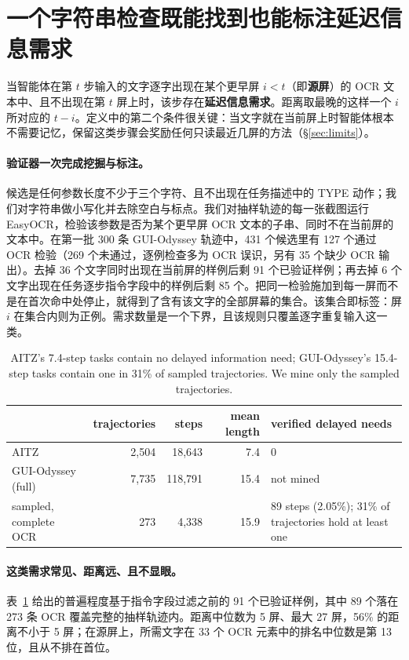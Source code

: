 \section{一个字符串检查既能找到也能标注延迟信息需求}
\label{sec:needs}
当智能体在第 $t$ 步输入的文字逐字出现在某个更早屏 $i<t$（即\textbf{源屏}）的 OCR 文本中、且不出现在第 $t$ 屏上时，该步存在\textbf{延迟信息需求}。距离取最晚的这样一个 $i$ 所对应的 $t-i$。定义中的第二个条件很关键：当文字就在当前屏上时智能体根本不需要记忆，保留这类步骤会奖励任何只读最近几屏的方法（\S\ref{sec:limits}）。

\paragraph{验证器一次完成挖掘与标注。} 候选是任何参数长度不少于三个字符、且不出现在任务描述中的 TYPE 动作；我们对字符串做小写化并去除空白与标点。我们对抽样轨迹的每一张截图运行 EasyOCR，检验该参数是否为某个更早屏 OCR 文本的子串、同时不在当前屏的文本中。在第一批 300 条 GUI-Odyssey 轨迹中，431 个候选里有 127 个通过 OCR 检验（269 个未通过，逐例检查多为 OCR 误识，另有 35 个缺少 OCR 输出）。去掉 36 个文字同时出现在当前屏的样例后剩 91 个已验证样例；再去掉 6 个文字出现在任务逐步指令字段中的样例后剩 85 个。把同一检验施加到每一屏而不是在首次命中处停止，就得到了含有该文字的全部屏幕的集合。该集合即标签：屏 $i$ 在集合内则为正例。需求数量是一个下界，且该规则只覆盖逐字重复输入这一类。

\begin{table}[t]
\centering\scriptsize\engfont
\caption{\rm AITZ's 7.4-step tasks contain no delayed information need; GUI-Odyssey's 15.4-step tasks contain one in 31\% of sampled trajectories. We mine only the sampled trajectories.}
\label{tab:prev}
\begin{tabular}{lrrrl}
\toprule
 & trajectories & steps & mean length & verified delayed needs \\
\midrule
AITZ~\citep{aitz} & 2,504 & 18,643 & 7.4 & 0 \\
GUI-Odyssey~\citep{guiodyssey} (full) & 7,735 & 118,791 & 15.4 & not mined \\
\quad sampled, complete OCR & 273 & 4,338 & 15.9 & 89 steps (2.05\%); 31\% of trajectories hold at least one \\
\bottomrule
\end{tabular}
\end{table}

\paragraph{这类需求常见、距离远、且不显眼。} 表~\ref{tab:prev} 给出的普遍程度基于指令字段过滤之前的 91 个已验证样例，其中 89 个落在 273 条 OCR 覆盖完整的抽样轨迹内。距离中位数为 5 屏、最大 27 屏，56\% 的距离不小于 5 屏；在源屏上，所需文字在 33 个 OCR 元素中的排名中位数是第 13 位，且从不排在首位。

